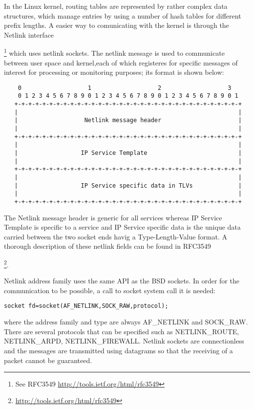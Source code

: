 In the Linux kernel, routing tables are represented by rather complex data structures, which manage entries by using a number of hash tables for different prefix lengths. A easier way to comunicating with the kernel is through the Netlink interface{\footnote{See RFC3549 \url{http://tools.ietf.org/html/rfc3549}} which uses netlink sockets.
The netlink message is used to communicate between user space and kernel,each of which registeres for specific messages of interest for processing or monitoring purposes; its format is shown below:
\begin{lstlisting}
    0                   1                   2                   3
    0 1 2 3 4 5 6 7 8 9 0 1 2 3 4 5 6 7 8 9 0 1 2 3 4 5 6 7 8 9 0 1
   +-+-+-+-+-+-+-+-+-+-+-+-+-+-+-+-+-+-+-+-+-+-+-+-+-+-+-+-+-+-+-+-+
   |                                                               |
   |                   Netlink message header                      |
   |                                                               |
   +-+-+-+-+-+-+-+-+-+-+-+-+-+-+-+-+-+-+-+-+-+-+-+-+-+-+-+-+-+-+-+-+
   |                                                               |
   |                  IP Service Template                          |
   |                                                               |
   +-+-+-+-+-+-+-+-+-+-+-+-+-+-+-+-+-+-+-+-+-+-+-+-+-+-+-+-+-+-+-+-+
   |                                                               |
   |                  IP Service specific data in TLVs             |
   |                                                               |
   +-+-+-+-+-+-+-+-+-+-+-+-+-+-+-+-+-+-+-+-+-+-+-+-+-+-+-+-+-+-+-+-+
\end{lstlisting}

The Netlink message header is generic for all services whereas IP Service Template is specific to a service and IP Service specific data is the unique data carried between the two socket ends havig a Type-Length-Value format. A thorough description of these netlink fields can be found in RFC3549 {\footnote{\url{http://tools.ietf.org/html/rfc3549}}.

Netlink address family uses the same API as the BSD sockets. In order for the communication to be possible, a call to socket system call it is needed:
\begin{lstlisting}
socket fd=socket(AF_NETLINK,SOCK_RAW,protocol);
\end{lstlisting}
where the address family and type are always AF_NETLINK and SOCK_RAW. There are several protocols that can be specified such as NETLINK_ROUTE, NETLINK_ARPD, NETLINK_FIREWALL.
Netlink sockets are connectionless and the messages are transmitted using datagrams so that the receiving of a packet cannot be guaranteed.

}}
